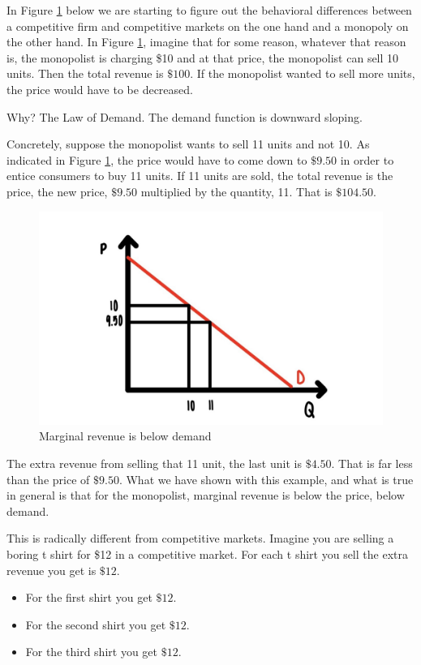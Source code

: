 \documentclass[
]{book}
\providecommand{\tightlist}{%
  \setlength{\itemsep}{0pt}\setlength{\parskip}{0pt}}
\begin{document}
In Figure \ref{fig:monopoly02} below we are starting to figure out the behavioral differences between a competitive firm and competitive markets on the one hand and a monopoly on the other hand. In Figure \ref{fig:monopoly02}, imagine that for some reason, whatever that reason is, the monopolist is charging \$10 and at that price, the monopolist can sell 10 units. Then the total revenue is \(\$100\). If the monopolist wanted to sell more units, the price would have to be decreased.

Why? The Law of Demand. The demand function is downward sloping.

Concretely, suppose the monopolist wants to sell 11 units and not 10. As indicated in Figure \ref{fig:monopoly02}, the price would have to come down to \(\$9.50\) in order to entice consumers to buy 11 units. If 11 units are sold, the total revenue is the price, the new price, \(\$9.50\) multiplied by the quantity, 11. That is \(\$104.50\).

\begin{figure}

{\centering \includegraphics[width=0.75\linewidth]{img/monopoly/fig2} 

}

\caption{Marginal revenue is below demand}\label{fig:monopoly02}
\end{figure}

The extra revenue from selling that 11 unit, the last unit is \(\$4.50\). That is far less than the price of \(\$9.50\).
What we have shown with this example, and what is true in general is that for the monopolist, marginal revenue is below the price, below demand.

This is radically different from competitive markets. Imagine you are selling a boring t shirt for \$12 in a competitive market. For each t shirt you sell the extra revenue you get is \(\$12\).

\begin{itemize}
\tightlist
\item
  For the first shirt you get \(\$12\).
\item
  For the second shirt you get \(\$12\).
\item
  For the third shirt you get \(\$12\).
\end{itemize}
\end{document}
